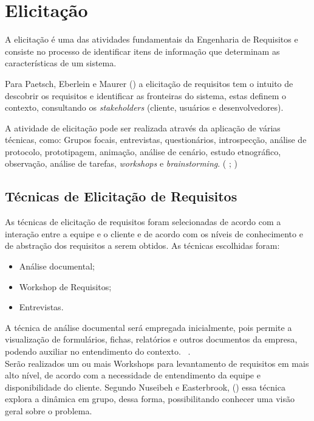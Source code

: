 \chapter[Elicitação]{Elicitação}
A elicitação é uma das atividades fundamentais da Engenharia de Requisitos e consiste no processo de identificar
itens de informação que determinam as características de um sistema. \cite{jitnah} 

Para Paetsch, Eberlein e Maurer (\citeyear{paetsch}) a elicitação de requisitos tem o intuito de descobrir
os requisitos e identificar as fronteiras do sistema, estas definem o contexto, consultando os \textit{stakeholders} (cliente, usuários e desenvolvedores).

A atividade de elicitação pode ser realizada através da aplicação de várias técnicas, como: Grupos focais, entrevistas, questionários,
introspecção, análise de protocolo, prototipagem, animação, análise de cenário, estudo etnográfico, observação, análise de tarefas,
\textit{workshops} e \textit{brainstorming}. (\cite{jitnah} ; \cite{coulin})

\section{Técnicas de Elicitação de Requisitos}

As técnicas de elicitação de requisitos foram selecionadas de acordo com a interação entre a equipe e o cliente e de acordo com os níveis de conhecimento e de abstração dos requisitos a serem obtidos.
As técnicas escolhidas foram:\\
\begin{itemize}
\item Análise documental;
\item Workshop de Requisitos;
\item Entrevistas.
\end{itemize}

A técnica de análise documental será empregada inicialmente, pois permite a visualização de formulários, fichas, relatórios e outros documentos da empresa, podendo auxiliar no entendimento do contexto. ~\cite{falbo}.\\

Serão realizados um ou mais Workshops para levantamento de requisitos em mais alto nível, de acordo com a necessidade de entendimento da equipe e disponibilidade do cliente.
Segundo Nuseibeh e Easterbrook, (\citeyear{nuseibeh}) essa técnica explora a dinâmica em grupo, dessa forma, possibilitando conhecer uma visão geral sobre o problema.\\

